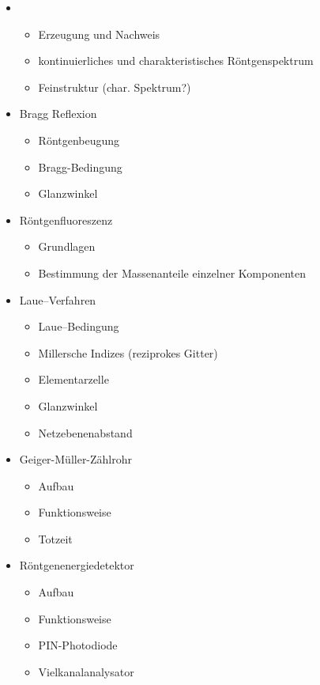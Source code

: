 \documentclass[10pt, a4paper]{article}
\begin{document}
\begin{itemize}
\item
  \begin{itemize}
    \item Erzeugung und Nachweis
    \item kontinuierliches und charakteristisches Röntgenspektrum
    \item Feinstruktur (char. Spektrum?)
  \end{itemize}
  \item Bragg Reflexion
  \begin{itemize}
    \item Röntgenbeugung
    \item Bragg-Bedingung
    \item Glanzwinkel
  \end{itemize}
  \item Röntgenfluoreszenz
  \begin{itemize}
    \item Grundlagen
    \item Bestimmung der Massenanteile einzelner Komponenten
  \end{itemize}
  \item Laue--Verfahren
  \begin{itemize}
    \item Laue--Bedingung
    \item Millersche Indizes (reziprokes Gitter)
    \item Elementarzelle
    \item Glanzwinkel
    \item Netzebenenabstand
  \end{itemize}
  \item Geiger-Müller-Zählrohr
  \begin{itemize}
    \item Aufbau
    \item Funktionsweise
    \item Totzeit
  \end{itemize}
  \item Röntgenenergiedetektor
  \begin{itemize}
    \item Aufbau
    \item Funktionsweise
    \item PIN-Photodiode
    \item Vielkanalanalysator
  \end{itemize}
\end{itemize}
\end{document}
